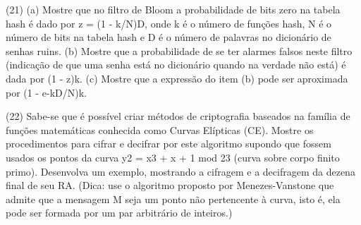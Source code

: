 \documentclass[10pt,a4paper]{report}
\begin{document}
(21) (a) Mostre que no filtro de Bloom a probabilidade de bits zero na tabela hash é dado por z = (1 - k/N)D, onde k é o número de funções hash, N é o número de bits na tabela hash e D é o número de palavras no dicionário de senhas ruins.
(b) Mostre que a probabilidade de se ter alarmes falsos neste filtro (indicação de que uma senha está no dicionário quando na verdade não está) é dada por (1 - z)k.
(c) Mostre que a expressão do item (b) pode ser aproximada por (1 - e-kD/N)k.

(22) Sabe-se que é possível criar métodos de criptografia baseados na família de funções matemáticas conhecida como Curvas Elípticas (CE). Mostre os procedimentos para cifrar e decifrar por este algoritmo supondo que fossem usados os pontos da curva y2 = x3 + x + 1 mod 23 (curva sobre corpo finito primo). Desenvolva um exemplo, mostrando a cifragem e a decifragem da dezena final de seu RA. (Dica: use o algoritmo proposto por Menezes-Vanstone que admite que a mensagem M seja um ponto não pertencente à curva, isto é, ela pode ser formada por um par arbitrário de inteiros.)
\end{document}
